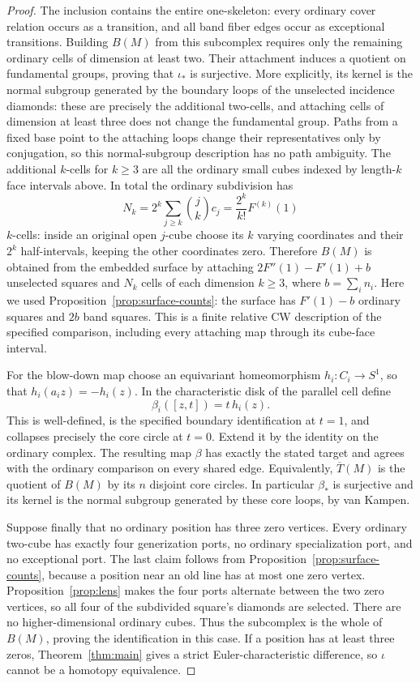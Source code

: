 \begin{proof}
The inclusion contains the entire one-skeleton: every ordinary cover
relation occurs as a transition, and all band fiber edges occur as
exceptional transitions. Building $B(M)$ from this subcomplex requires
only the remaining ordinary cells of dimension at least two. Their
attachment induces a quotient on fundamental groups, proving that
$\iota_*$ is surjective. More explicitly, its kernel is the normal
subgroup generated by the boundary loops of the unselected incidence
diamonds: these are precisely the additional two-cells, and attaching
cells of dimension at least three does not change the fundamental group.
Paths from a fixed base point to the attaching loops change their
representatives only by conjugation, so this normal-subgroup description
has no path ambiguity. The additional $k$-cells for $k\geq3$ are all the
ordinary small cubes indexed by length-$k$ face intervals above. In total
the ordinary subdivision has
\[
 N_k=2^k\sum_{j\geq k}\binom jk c_j
     =\frac{2^k}{k!}F^{(k)}(1)
\]
$k$-cells: inside an original open $j$-cube choose its $k$ varying
coordinates and their $2^k$ half-intervals, keeping the other coordinates
zero. Therefore $B(M)$ is obtained from the embedded surface by attaching
$2F''(1)-F'(1)+b$ unselected squares and $N_k$ cells of each dimension
$k\geq3$, where $b=\sum_i n_i$. Here we used Proposition~\ref{prop:surface-counts}: the surface has
$F'(1)-b$ ordinary squares and $2b$ band squares. This is a finite
relative CW description of the specified comparison, including every
attaching map through its cube-face interval.

For the blow-down map choose an equivariant
homeomorphism $h_i:C_i\to S^1$, so that
$h_i(a_i z)=-h_i(z)$. In the characteristic disk of the parallel cell
define
\[
 \beta_i([z,t])=t\,h_i(z).
\]
This is well-defined, is the specified boundary identification at
$t=1$, and collapses precisely the core circle at $t=0$. Extend it by
the identity on the ordinary complex. The resulting map $\beta$ has
exactly the stated target and agrees with the ordinary comparison on
every shared edge. Equivalently, $\overline T(M)$ is the quotient of
$B(M)$ by its $n$ disjoint core circles. In particular $\beta_*$ is
surjective and its kernel is the normal subgroup generated by these
core loops, by van Kampen.

Suppose finally that no ordinary position has three zero vertices.
Every ordinary two-cube has exactly four generization ports, no
ordinary specialization port, and no exceptional port. The last claim
follows from Proposition~\ref{prop:surface-counts}, because a position near an old line has at most one
zero vertex. Proposition~\ref{prop:lens} makes the four ports alternate between the two zero
vertices, so all four of the subdivided square's diamonds are selected.
There are no higher-dimensional ordinary cubes. Thus the subcomplex
is the whole of $B(M)$, proving the identification in this case. If a
position has at least three zeros, Theorem~\ref{thm:main} gives a strict Euler-characteristic
difference, so $\iota$ cannot be a homotopy equivalence.


\end{proof}
